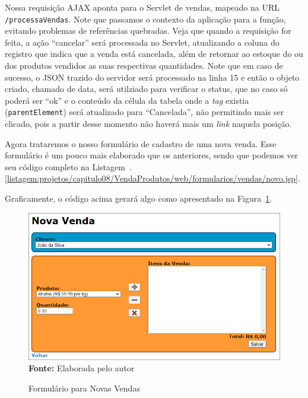 Nossa requisição AJAX aponta para o Servlet de vendas, mapeado na URL\newline%
\texttt{/processaVendas}. Note que passamos o contexto da aplicação para a função, evitando problemas de referências quebradas. Veja que quando a requisição for feita, a ação ``cancelar'' será processada no Servlet, atualizando a coluna do registro que indica que a venda está cancelada, além de retornar ao estoque do ou dos produtos vendidos as suas respectivas quantidades. Note que em caso de sucesso, o JSON trazido do servidor será processado na linha 15 e então o objeto criado, chamado de data, será utilziado para verificar o status, que no caso só poderá ser ``ok'' e o conteúdo da célula da tabela onde a \textit{tag}  existia (\texttt{parentElement}) será atualizado para ``Cancelada'', não permitindo mais ser clicado, pois a partir desse momento não haverá mais um \textit{link} naquela posição.

Agora trataremos o nosso formulário de cadastro de uma nova venda. Esse formulário é um pouco mais elaborado que os anteriores, sendo que podemos ver seu código completo na Listagem~\thechapter.\ref{listagem:projetos/capitulo08/VendaProdutos/web/formularios/vendas/novo.jsp}.


Graficamente, o código acima gerará algo como apresentado na Figura~\ref{fig:cap08FormularioNovaVenda}.

\FloatBarrier
\begin{figure}[!htbp]
    \centering
    \caption{Formulário para Novas Vendas}
    \includegraphics[scale=0.7]{imagens/cap08FormularioNovaVenda}
    \\\textbf{Fonte:} Elaborada pelo autor
    \label{fig:cap08FormularioNovaVenda}
\end{figure}
\FloatBarrier

